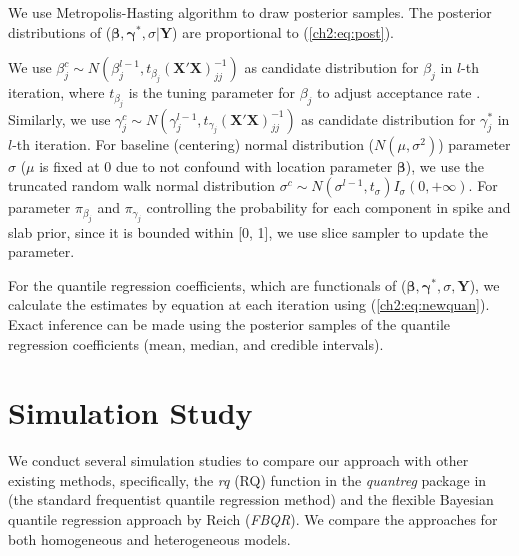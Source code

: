 \documentclass[12pt]{article}
\newcommand{\polya}{P\'{o}lya}
\begin{document}
We use Metropolis-Hasting algorithm to draw posterior samples.
The posterior distributions of ($\bm \beta, \bm \gamma^{*}, \sigma| \bm Y$) are proportional to (\ref{ch2:eq:post}).

We use $\beta_j^c \sim N(\beta_j^{l-1}, t_{\beta_j} (\bm{X'X})^{-1}_{jj})$ as candidate distribution for $\beta_j$ in $l$-th iteration,
where $t_{\beta_j}$ is the tuning parameter for $\beta_j$ to adjust acceptance rate \citep{jara2009}.
Similarly, we use $\gamma_j^c \sim N(\gamma_j^{l-1}, t_{\gamma_j}(\bm{X'X})^{-1}_{jj})$ as candidate distribution for $\gamma_j^{*}$ in $l$-th iteration.
For baseline (centering) normal distribution ($N(\mu, \sigma^2)$) parameter $\sigma$ ($\mu$ is fixed at 0 due to not confound with location parameter $\bm \beta$),
we use the truncated random walk normal distribution $\sigma^c \sim N(\sigma^{l-1}, t_{\sigma}) I_{\sigma}(0, +\infty)$.
For parameter $\pi_{\beta_j}$ and $\pi_{\gamma_j}$ controlling the probability for each component in spike and slab prior,
since it is bounded within [0, 1], we use slice sampler to update the parameter.



For the quantile regression coefficients, which are functionals of ($\bm \beta, \bm \gamma^{*}, \sigma, \bm Y$),
we calculate the estimates by equation at each iteration using (\ref{ch2:eq:newquan}).
Exact inference can be made using the posterior samples of the quantile regression coefficients (mean, median, and credible intervals).

\section{Simulation Study}
\label{ch2:sec:simulations}
We conduct several simulation studies to compare our approach with
other existing methods, specifically, the \textit{rq} (RQ) function in the
\textit{quantreg} package \citep{quantreg} in \cite{R} (the standard
frequentist quantile regression method) and the flexible Bayesian
quantile regression approach by Reich (\textit{FBQR}).  We compare the
approaches for both homogeneous and heterogeneous models.
\end{document}
